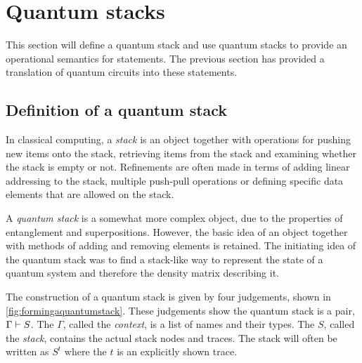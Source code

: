 \section{Quantum stacks}\label{sec:quantumstacksemantics}
This section will define a quantum stack and use quantum stacks to 
provide an operational semantics
for \lqpl{} statements. The previous section has 
provided a translation of quantum circuits  into these statements. 
\subsection{Definition of a quantum stack}\label{subsec:definitionquantumstack}
In classical computing, a \emph{stack} is an object together with operations
for pushing new items onto the stack, retrieving items from the stack and 
examining whether the stack is empty or not. Refinements are often made in
terms of adding linear addressing to the stack, multiple push-pull operations
or defining specific data elements that are allowed on the stack.

A \emph{quantum stack} is a somewhat more complex object, due to the properties
of entanglement and superpositions. However, the basic 
idea of an object together with
methods of adding and removing elements is retained. The initiating 
idea of the quantum stack was to find a stack-like  way to represent the
state of a quantum system and therefore the density matrix describing it.

The construction of a quantum stack is given by four judgements, shown
in \vref{fig:formingaquantumstack}. These judgements show the quantum stack
is a pair, $\Gamma \vdash S$.  The $\Gamma$, called the \emph{context},
is a list of names and their types. The $S$, called the \emph{stack}, contains
the actual stack nodes and traces. The stack will often be written as $S^t$ 
where the $t$ is an explicitly shown trace.

